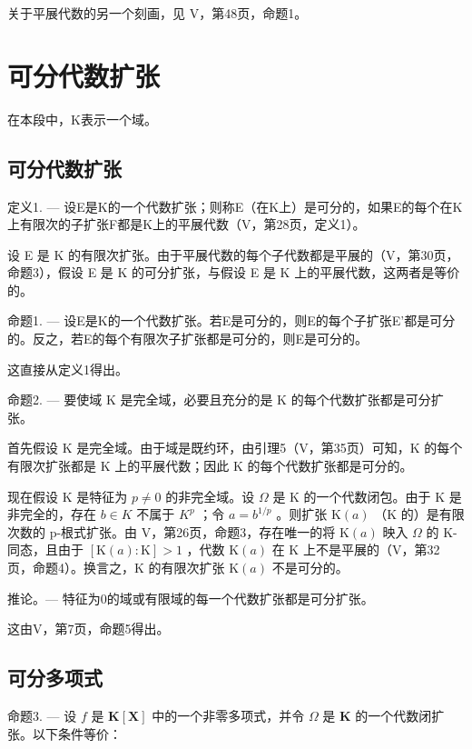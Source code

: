 关于平展代数的另一个刻画，见 V，第48页，命题1。

\section{可分代数扩张}

在本段中，K表示一个域。

\subsection{可分代数扩张}

定义1. --- 设E是K的一个代数扩张；则称E（在K上）是可分的，如果E的每个在K上有限次的子扩张F都是K上的平展代数（V，第28页，定义1）。

设 E 是 K 的有限次扩张。由于平展代数的每个子代数都是平展的（V，第30页，命题3），假设 E 是 K 的可分扩张，与假设 E 是 K 上的平展代数，这两者是等价的。

命题1. --- 设E是K的一个代数扩张。若E是可分的，则E的每个子扩张E'都是可分的。反之，若E的每个有限次子扩张都是可分的，则E是可分的。

这直接从定义1得出。

命题2. --- 要使域 K 是完全域，必要且充分的是 K 的每个代数扩张都是可分扩张。

首先假设 K 是完全域。由于域是既约环，由引理5（V，第35页）可知，K 的每个有限次扩张都是 K 上的平展代数；因此 K 的每个代数扩张都是可分的。

现在假设 K 是特征为 \(p \neq 0\) 的非完全域。设 \(\Omega\) 是 K 的一个代数闭包。由于 K 是非完全的，存在 \(b \in K\) 不属于 \(K^{p}\) ；令 \(a = b^{1/p}\) 。则扩张 \(\mathrm{K}(a)\) （K 的）是有限次数的 p-根式扩张。由 V，第26页，命题3，存在唯一的将 \(\mathrm{K}(a)\) 映入 \(\Omega\) 的 K-同态，且由于 \([\mathrm{K}(a):\mathrm{K}] > 1\) ，代数 \(\mathrm{K}(a)\) 在 K 上不是平展的（V，第32页，命题4）。换言之，K 的有限次扩张 \(\mathrm{K}(a)\) 不是可分的。

推论。--- 特征为0的域或有限域的每一个代数扩张都是可分扩张。

这由V，第7页，命题5得出。

\subsection{可分多项式}

命题3. --- 设 \(f\) 是 \(\mathbf{K}[\mathbf{X}]\) 中的一个非零多项式，并令 \(\Omega\) 是 \(\mathbf{K}\) 的一个代数闭扩张。以下条件等价：

